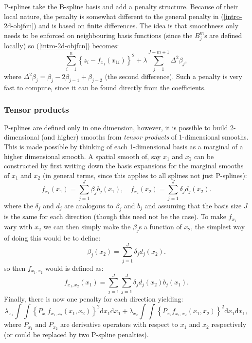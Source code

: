 P-splines take the B-spline basis and add a penalty structure. Because of their local nature, the penalty is somewhat different to the general penalty in (\ref{intro-2d-objfcn}) and is based on finite differences. The idea is that smoothness only needs to be enforced on neighbouring basis functions (since the $B^m_j$s are defined locally) so (\ref{intro-2d-objfcn}) becomes:
\begin{equation*}
\sum_{i=1}^n \left \{ z_i - f_{x_1}(x_{1i}) \right \}^2 +  \lambda \sum_{j=1}^{J+m+1} \Delta^2 \beta_j,
\end{equation*}
where $\Delta^2 \beta_j = \beta_j -2\beta_{j-1} + \beta_{j-2}$ (the second difference). Such a penalty is very fast to compute, since it can be found directly from the coefficients.

\subsubsection{Tensor products}
\label{GAMtensor}

P-splines are defined only in one dimension, however, it is possible to build 2-dimensional (and higher) smooths from \textit{tensor products} of 1-dimensional smooths. This is made possible by thinking of each 1-dimensional basis as a marginal of a higher dimensional smooth. A spatial smooth of, say $x_1$ and $x_2$ can be constructed by first writing down the basis expansions for the marginal smooths of $x_1$ and $x_2$ (in general terms, since this applies to all splines not just P-splines):
\begin{equation*}
f_{x_1}(x_1) = \sum_{j=1}^J \beta_j b_j(x_{1}), \quad  f_{x_2}(x_2) = \sum_{j=1}^J \delta_j d_j(x_{2}).
\end{equation*}
where the $\delta_j$ and $d_j$ are analogous to $\beta_j$ and $b_j$ and assuming that the basis size $J$ is the same for each direction (though this need not be the case). To make $f_{x_1}$ vary with $x_2$ we can then simply make the $\beta_j$s a function of $x_2$, the simplest way of doing this would be to define:
\begin{equation*}
\beta_j(x_2) = \sum_{j=1}^J \delta_j d_j(x_{2}).
\end{equation*}
so then $f_{x_1,x_2}$ would is defined as:
\begin{equation*}
f_{x_1, x_2}(x_1) = \sum_{j=1}^J \sum_{j=1}^J \delta_j d_j(x_{2}) b_j(x_{1}).
\end{equation*}
Finally, there is now one penalty for each direction yielding:
\begin{equation*}
\lambda_{x_1} \int\int \left \{P_{x_1} f_{x_1, x_2}(x_1,x_2)\right \}^2 \text{d}x_1\text{d}x_1 + \lambda_{x_2} \int\int \left \{P_{x_2} f_{x_1, x_2}(x_1,x_2)\right \}^2 \text{d}x_1\text{d}x_1,
\end{equation*}
where $P_{x_1}$ and $P_{x_2}$ are derivative operators with respect to $x_1$ and $x_2$ respectively (or could be replaced by two P-spline penalties). 

